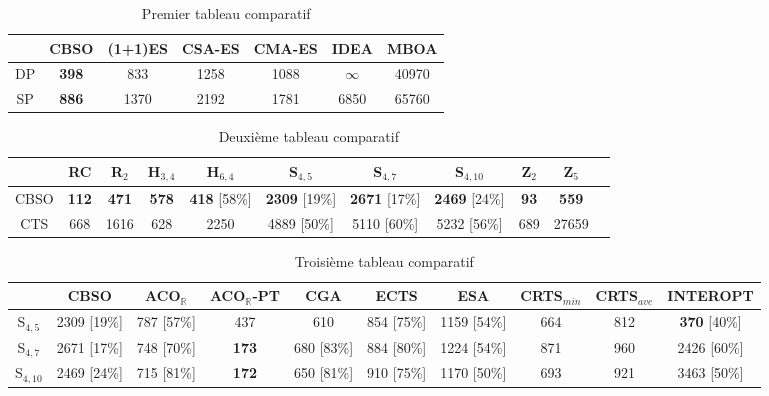 \begin{table}[H]\centering
	\begin{tabular}{ccccccc}
		\toprule \textbf{} & \textbf{CBSO} & \textbf{(1+1)ES} & \textbf{CSA-ES} & \textbf{CMA-ES} & \textbf{IDEA} & \textbf{MBOA}\\    \midrule
		DP & \textbf{398} & 833 & 1258 & 1088 & $\infty$ & 40970 \\   
		SP & \textbf{886} & 1370 & 2192 & 1781 & 6850 & 65760 \\ 	
		\bottomrule	
	\end{tabular}
	\caption{Premier tableau comparatif\label{evaltable1}}
\end{table}
\begin{landscape}
\begin{table}[H]\centering
	\begin{tabular}{ccccccccccc}
		\toprule \textbf{} & \textbf{RC} & \textbf{R$_2$} & \textbf{H$_{3,4}$} & \textbf{H$_{6,4}$} & \textbf{S$_{4,5}$} & \textbf{S$_{4,7}$} & \textbf{S$_{4,10}$} & \textbf{Z$_2$} & \textbf{Z$_5$}\\    \midrule
		CBSO & \textbf{112} & \textbf{471} & \textbf{578} & \textbf{418} [58\%] & \textbf{2309} [19\%] & \textbf{2671} [17\%] & \textbf{2469} [24\%] & \textbf{93} & \textbf{559}\\ 
		CTS & 668 & 1616 & 628 & 2250 & 4889 [50\%] & 5110 [60\%] & 5232 [56\%] & 689 & 27659\\  
		\bottomrule
	\end{tabular}
	\caption{Deuxième tableau comparatif\label{evaltable2}}
\end{table}

\vspace{1em}

\begin{table}[H]\centering
	\begin{tabular}{cccccccccc}
		\toprule\textbf{} & \textbf{CBSO} & \textbf{ACO$_\mathbb{R}$} & \textbf{ACO$_\mathbb{R}$-PT} & \textbf{CGA} & \textbf{ECTS} & \textbf{ESA} & \textbf{CRTS$_{min}$} & \textbf{CRTS$_{ave}$} & \textbf{INTEROPT}\\    \midrule
		S$_{4,5}$ & 2309 [19\%] & 787 [57\%] & 437 & 610 & 854 [75\%] & 1159 [54\%] & 664 & 812 & \textbf{370} [40\%] \\
		S$_{4,7}$ & 2671 [17\%] & 748 [70\%] & \textbf{173} & 680 [83\%] & 884 [80\%] & 1224 [54\%] & 871 & 960 & 2426 [60\%] \\
		S$_{4,10}$ & 2469 [24\%] & 715 [81\%] & \textbf{172} & 650 [81\%] & 910 [75\%] & 1170 [50\%] & 693 & 921 & {3463} [50\%] \\
	\bottomrule	  
	\end{tabular}
	\caption{Troisième tableau comparatif\label{evaltable3}}
\end{table}


\end{landscape}
